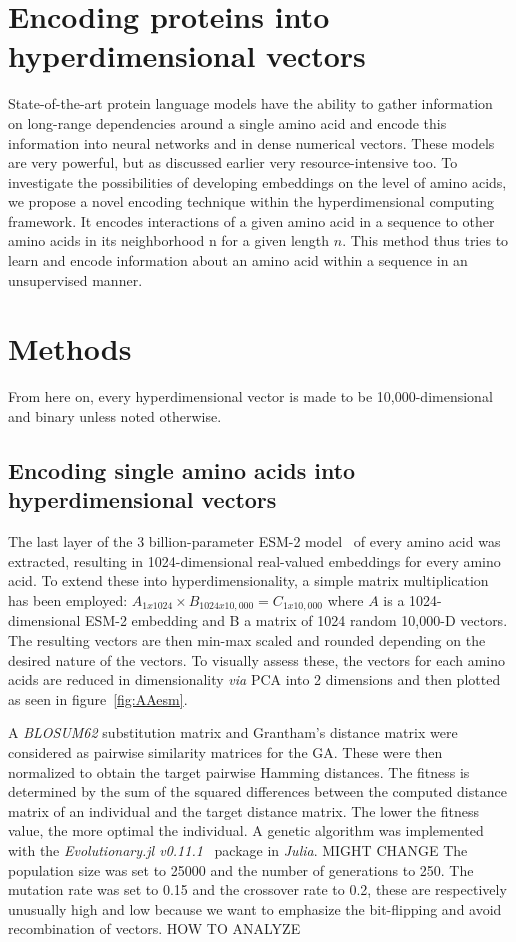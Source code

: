 \section{Encoding proteins into hyperdimensional vectors}
State-of-the-art protein language models have the ability to gather information on long-range dependencies around a single amino acid and encode this information into neural networks and in dense numerical vectors. These models are very powerful, but as discussed earlier very resource-intensive too. To investigate the possibilities of developing embeddings on the level of amino acids, we propose a novel encoding technique within the hyperdimensional computing framework. It encodes interactions of a given amino acid in a sequence to other amino acids in its neighborhood n for a given length $n$. This method thus tries to learn and encode information about an amino acid within a sequence in an unsupervised manner.
\section{Methods}
From here on, every hyperdimensional vector is made to be 10,000-dimensional and binary unless noted otherwise. 
\subsection*{Encoding single amino acids into hyperdimensional vectors}
The last layer of the 3 billion-parameter ESM-2 model~\cite{esm2} of every amino acid was extracted, resulting in 1024-dimensional real-valued embeddings for every amino acid. To extend these into hyperdimensionality, a simple matrix multiplication has been employed: $A_{1x1024} \times B_{1024x10,000} = C_{1x10,000}$ where $A$ is a 1024-dimensional ESM-2 embedding and B a matrix of 1024 random 10,000-D vectors. The resulting vectors are then min-max scaled and rounded depending on the desired nature of the vectors. To visually assess these, the vectors for each amino acids are reduced in dimensionality \textit{via} PCA into 2 dimensions and then plotted as seen in figure~\ref{fig:AAesm}.

A \textit{BLOSUM62} substitution matrix \cite{blosum} and Grantham's distance matrix \cite{aa_evolution} were considered as pairwise similarity matrices for the GA. These were then normalized to obtain the target pairwise Hamming distances. The fitness is determined by the sum of the squared differences between the computed distance matrix of an individual and the target distance matrix. The lower the fitness value, the more optimal the individual. A genetic algorithm was implemented with the \textit{Evolutionary.jl v0.11.1}~\cite{evojl} package in \textit{Julia}. MIGHT CHANGE The population size was set to 25000 and the number of generations to 250. The mutation rate was set to 0.15 and the crossover rate to 0.2, these are respectively unusually high and low because we want to emphasize the bit-flipping and avoid recombination of vectors. HOW TO ANALYZE

